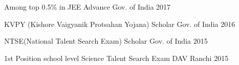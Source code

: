 \begin{cvhonors}


  \cvhonor
  {Among top 0.5\%}
  {in JEE Advance}
  {Gov. of India}
  {2017}

  \cvhonor
  {KVPY (Kishore Vaigyanik Protsahan Yojana)}
  {Scholar}
  {Gov. of India}
  {2016}


  \cvhonor
  {NTSE(National Talent Search Exam)}
  {Scholar}
  {Gov. of India}
  {2015}
  
  \cvhonor
  {1st Position}
  {school level Science Talent Search Exam}
  {DAV Ranchi}
  {2015}


\end{cvhonors}


